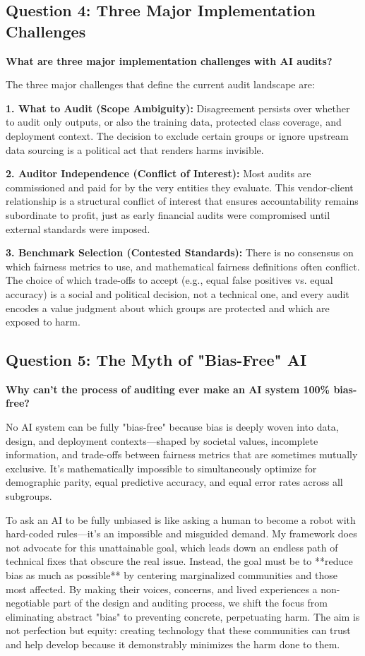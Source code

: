 \documentclass[12pt,letterpaper]{article}
\begin{document}
\subsection*{Question 4: Three Major Implementation Challenges}
\textbf{What are three major implementation challenges with AI audits?}

The three major challenges that define the current audit landscape are:

\textbf{1. What to Audit (Scope Ambiguity):} Disagreement persists over whether to audit only outputs, or also the training data, protected class coverage, and deployment context. The decision to exclude certain groups or ignore upstream data sourcing is a political act that renders harms invisible.

\textbf{2. Auditor Independence (Conflict of Interest):} Most audits are commissioned and paid for by the very entities they evaluate. This vendor-client relationship is a structural conflict of interest that ensures accountability remains subordinate to profit, just as early financial audits were compromised until external standards were imposed.

\textbf{3. Benchmark Selection (Contested Standards):} There is no consensus on which fairness metrics to use, and mathematical fairness definitions often conflict. The choice of which trade-offs to accept (e.g., equal false positives vs. equal accuracy) is a social and political decision, not a technical one, and every audit encodes a value judgment about which groups are protected and which are exposed to harm.

\subsection*{Question 5: The Myth of "Bias-Free" AI}
\textbf{Why can't the process of auditing ever make an AI system 100\% bias-free?}

No AI system can be fully "bias-free" because bias is deeply woven into data, design, and deployment contexts—shaped by societal values, incomplete information, and trade-offs between fairness metrics that are sometimes mutually exclusive. It's mathematically impossible to simultaneously optimize for demographic parity, equal predictive accuracy, and equal error rates across all subgroups.

To ask an AI to be fully unbiased is like asking a human to become a robot with hard-coded rules—it's an impossible and misguided demand. My framework does not advocate for this unattainable goal, which leads down an endless path of technical fixes that obscure the real issue. Instead, the goal must be to **reduce bias as much as possible** by centering marginalized communities and those most affected. By making their voices, concerns, and lived experiences a non-negotiable part of the design and auditing process, we shift the focus from eliminating abstract "bias" to preventing concrete, perpetuating harm. The aim is not perfection but equity: creating technology that these communities can trust and help develop because it demonstrably minimizes the harm done to them.
\end{document}

